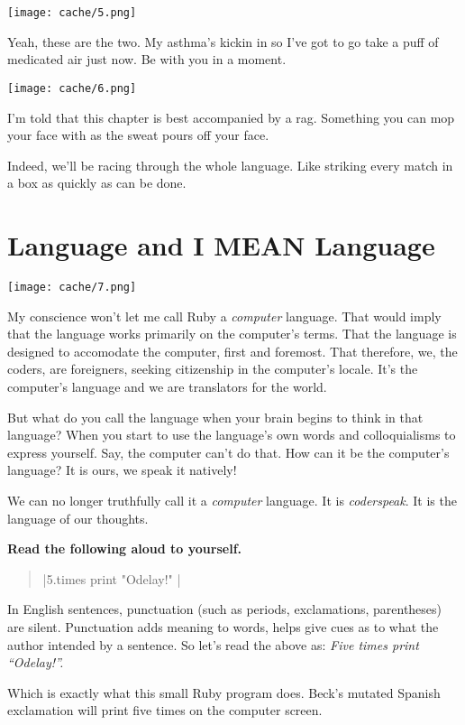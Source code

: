 \documentclass[12pt,twoside]{report}
\begin{document}
	\texttt{[image: cache/5.png]}

Yeah, these are the two.  My asthma's kickin in so I've got to go take
a puff of medicated air just now.  Be with you in a moment.

	\texttt{[image: cache/6.png]}

I'm told that this chapter is best accompanied by a rag.  Something
you can mop your face with as the sweat pours off your face.

Indeed, we'll be racing through the whole language.  Like striking
every match in a box as quickly as can be done.


\section{Language and I MEAN Language}

	\texttt{[image: cache/7.png]}

My conscience won't let me call Ruby a {\em computer} language.  That
would imply that the language works primarily on the computer's terms.
That the language is designed to accomodate the computer, first and
foremost.  That therefore, we, the coders, are foreigners, seeking
citizenship in the computer's locale.  It's the computer's language
and we are translators for the world.

But what do you call the language when your brain begins to think in
that language?  When you start to use the language's own words and
colloquialisms to express yourself.  Say, the computer can't do that.
How can it be the computer's language?  It is ours, we speak it
natively!

We can no longer truthfully call it a {\em computer} language.  It is
{\em coderspeak}.  It is the language of our thoughts.

{\bf Read the following aloud to yourself.}

\begin{quote}
\rubyinline|5.times { print "Odelay!" }|\end{quote}

In English sentences, punctuation (such as periods, exclamations,
parentheses) are silent.  Punctuation adds meaning to words, helps
give cues as to what the author intended by a sentence.  So let's read
the above as: {\em Five times print ``Odelay!''.}

Which is exactly what this small Ruby program does.  Beck's mutated
Spanish exclamation will print five times on the computer screen.
\end{document}
